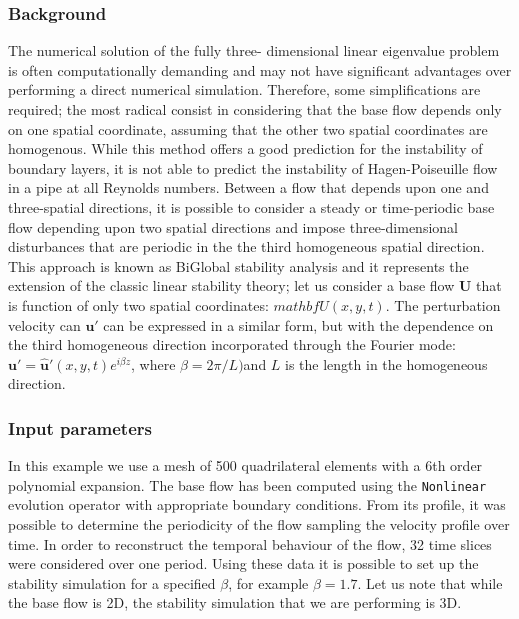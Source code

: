   
\subsubsection{Background}

The numerical solution of the fully three- dimensional linear eigenvalue problem is often computationally demanding and may not have significant advantages over performing a direct numerical simulation. Therefore, some simplifications are required; the most radical consist in considering that the base flow depends only on one spatial coordinate, assuming that the other two spatial coordinates are homogenous.  While this method offers a good prediction for the instability of boundary layers, it is not able to predict the instability of Hagen-Poiseuille flow in a pipe at all Reynolds numbers.  Between a flow that depends upon one and three-spatial directions, it is possible to consider a steady or time-periodic base flow depending upon two spatial directions and impose three-dimensional disturbances that are periodic in the the third homogeneous  spatial direction. This approach is known as BiGlobal stability analysis and it represents the extension of the classic linear stability theory; let us consider a base flow $\mathbf{U}$ that is function of only two spatial coordinates: $mathbf{U}(x, y,t)$. The perturbation velocity can $\mathbf{u'}$ can be expressed in a similar form, but with the dependence on the third homogeneous direction incorporated through the Fourier mode: $\mathbf{u'}=\mathbf{\hat{u}'}(x, y, t) e^{i \beta z}$, where $\beta=2\pi/L)$and $L$ is the length in the homogeneous direction.

\subsubsection{Input parameters}

In this example we use a mesh of 500 quadrilateral elements with a 6th order polynomial expansion. The base flow has been computed using the \texttt{Nonlinear} evolution operator with appropriate boundary conditions. From its profile, it was possible to determine the periodicity of the flow sampling the velocity profile over time. In order to reconstruct the temporal behaviour of the flow, 32 time slices were considered over one period. Using these data it is possible to set up the stability simulation for a specified $\beta$, for example $\beta=1.7$. Let us note that while the base flow is 2D, the stability simulation that we are performing is 3D.

